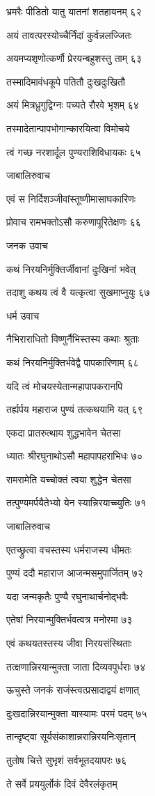 भ्रमरैः पीडितो यातु यातनां शतहायनम् ६२

अयं तावत्परस्योच्चैर्निंदां कुर्वन्नलज्जितः

अयमप्यशृणोत्कर्णौ प्रेरयन्बहुशस्तु ताम् ६३

तस्मादिमावंधकूपे पतितौ दुःखदुःखितौ

अयं मित्रध्रुगुद्विग्नः पच्यते रौरवे भृशम् ६४

तस्मादेतान्पापभोगान्कारयित्वा विमोचये

त्वं गच्छ नरशार्दूल पुण्यराशिविधायकः ६५

जाबालिरुवाच

एवं स निर्दिशञ्जीवांस्तूष्णीमासाघकारिणः

प्रोवाच रामभक्तोऽसौ करुणापूरितेक्षणः ६६

जनक उवाच

कथं निरयनिर्मुक्तिर्जीवानां दुःखिनां भवेत्

तदाशु कथय त्वं वै यत्कृत्वा सुखमाप्नुयुः ६७

धर्म उवाच

नैभिराराधितो विष्णुर्नैभिस्तस्य कथाः श्रुताः

कथं निरयनिर्मुक्तिर्भवेद्वै पापकारिणाम् ६८

यदि त्वं मोचयस्येतान्महापापकरानपि

तर्ह्यर्पय महाराज पुण्यं तत्कथयामि यत् ६९

एकदा प्रातरुत्थाय शुद्धभावेन चेतसा

ध्यातः श्रीरघुनाथोऽसौ महापापहराभिधः ७०

रामरामेति यच्चोक्तं त्वया शुद्धेन चेतसा

तत्पुण्यमर्पयैतेभ्यो येन स्यान्निरयाच्च्युतिः ७१

जाबालिरुवाच

एतच्छ्रुत्वा वचस्तस्य धर्मराजस्य धीमतः

पुण्यं ददौ महाराज आजन्मसमुपार्जितम् ७२

यदा जन्मकृतैः पुण्यै रघुनाथार्चनोद्भवैः

एतेषां निरयान्मुक्तिर्भवत्वत्र मनोरमा ७३

एवं कथयतस्तस्य जीवा निरयसंस्थिताः

तत्क्षणान्निरयान्मुक्ता जाता दिव्यवपुर्धराः ७४

ऊचुस्ते जनकं राजंस्त्वत्प्रसादाद्वयं क्षणात्

दुःखदान्निरयान्मुक्ता यास्यामः परमं पदम् ७५

तान्दृष्ट्वा सूर्यसंकाशान्नरान्निरयनिःसृतान्

तुतोष चित्ते सुभृशं सर्वभूतदयापरः ७६

ते सर्वे प्रययुर्लोकं दिवं देवैरलंकृतम्

